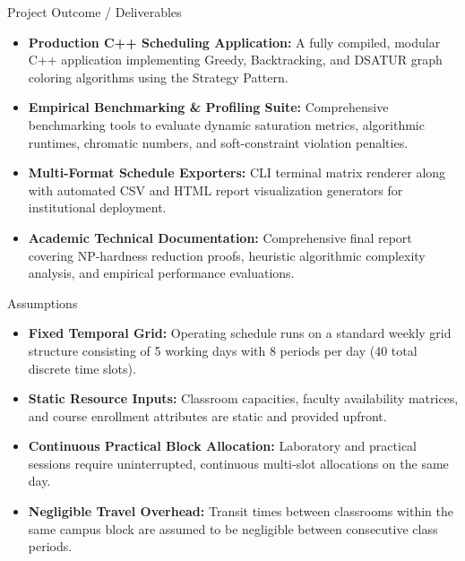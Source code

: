 \documentclass[11pt,a4paper]{article}
\newcommand{\blueheading}[1]{%
    {\sffamily\color{TitleBlue}\fontsize{15}{18}\selectfont #1}%
}
\newcommand{\answerbox}[2][]{%
    \vspace{2pt}\par
    \noindent
    {\itshape #2}\par
    \vspace{2pt}
}
\begin{document}
\vspace{5mm}

\blueheading{Project Outcome / Deliverables}

\vspace{1mm}

\answerbox{%
\begin{itemize}[leftmargin=*,noitemsep,topsep=2pt,itemsep=3pt]
    \item \textbf{Production C++ Scheduling Application:} A fully compiled, modular C++ application implementing Greedy, Backtracking, and DSATUR graph coloring algorithms using the Strategy Pattern.
    \item \textbf{Empirical Benchmarking & Profiling Suite:} Comprehensive benchmarking tools to evaluate dynamic saturation metrics, algorithmic runtimes, chromatic numbers, and soft-constraint violation penalties.
    \item \textbf{Multi-Format Schedule Exporters:} CLI terminal matrix renderer along with automated CSV and HTML report visualization generators for institutional deployment.
    \item \textbf{Academic Technical Documentation:} Comprehensive final report covering NP-hardness reduction proofs, heuristic algorithmic complexity analysis, and empirical performance evaluations.
\end{itemize}
}

\vspace{5mm}

\blueheading{Assumptions}

\vspace{2mm}


\answerbox{%
\begin{itemize}[leftmargin=*,noitemsep,topsep=2pt,itemsep=3pt]
    \item \textbf{Fixed Temporal Grid:} Operating schedule runs on a standard weekly grid structure consisting of 5 working days with 8 periods per day (40 total discrete time slots).
    \item \textbf{Static Resource Inputs:} Classroom capacities, faculty availability matrices, and course enrollment attributes are static and provided upfront.
    \item \textbf{Continuous Practical Block Allocation:} Laboratory and practical sessions require uninterrupted, continuous multi-slot allocations on the same day.
    \item \textbf{Negligible Travel Overhead:} Transit times between classrooms within the same campus block are assumed to be negligible between consecutive class periods.
\end{itemize}
}
\end{document}
